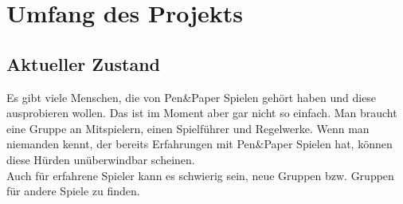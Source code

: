 \documentclass[DIV=13, 10pt,a4paper]{scrartcl}
\begin{document}
\section{Umfang des Projekts}
	\subsection*{Aktueller Zustand}
	Es gibt viele Menschen, die von Pen\&Paper Spielen gehört haben und diese ausprobieren wollen. Das ist im Moment aber gar nicht so einfach. Man braucht eine Gruppe an Mitspielern, einen Spielführer und Regelwerke. Wenn man niemanden kennt, der bereits Erfahrungen mit Pen\&Paper Spielen hat, können diese Hürden unüberwindbar scheinen.\\
	Auch für erfahrene Spieler kann es schwierig sein, neue Gruppen bzw. Gruppen für andere Spiele zu finden. 	
\end{document}

